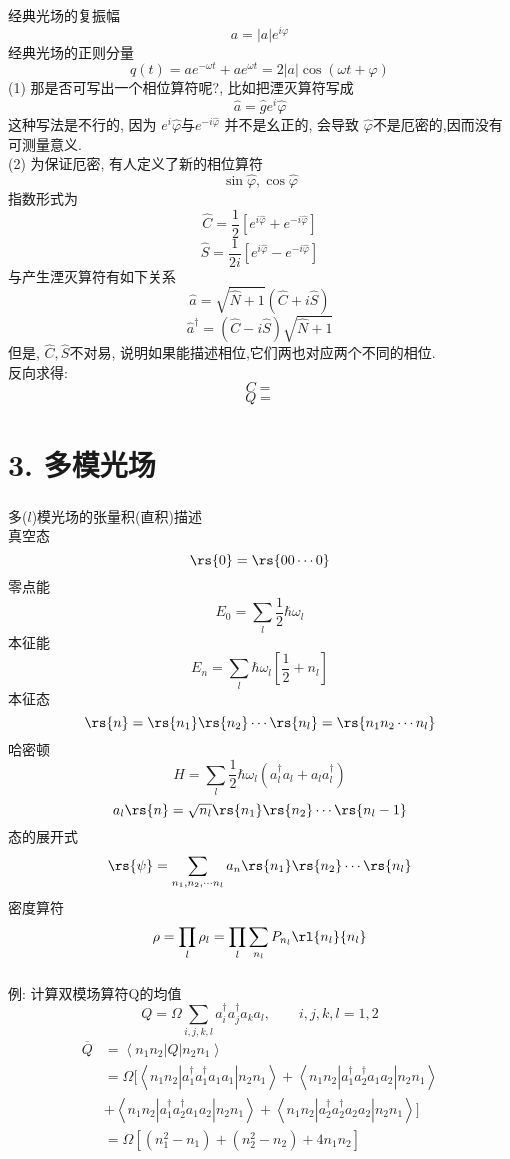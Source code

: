 \begin{frame} [allowframebreaks=] 
 \frametitle{}
      经典光场的复振幅 
      \[ a= \left|a\right| e^{i\varphi}\]
      经典光场的正则分量
      \[ q(t) = a e^{-\omega t} + a e^{\omega t} = 2\left|a \right|\cos(\omega t + \varphi)\]
      (1) 那是否可写出一个相位算符呢?, 比如把湮灭算符写成
      \[ \hat{a} = \hat{g} e ^ i \hat{\varphi} \]
      这种写法是不行的, 因为
      $e ^ i \hat{\varphi}$与$e ^ {-i \hat{\varphi}}$ 并不是幺正的, 会导致 $\hat{\varphi}$不是厄密的,因而没有可测量意义. \\ {\vspace*{0.3em}}
      (2) 为保证厄密, 有人定义了新的相位算符
      \[ \sin \hat{\varphi}, \cos \hat{\varphi}\]
      指数形式为
      \[\hat{C}= \frac{1}{2} [e^{i \hat{\varphi}} + e^{- i \hat{\varphi}}]\]
      \[\hat{S}= \frac{1}{2i} [e^{i \hat{\varphi}} - e^{- i \hat{\varphi}}]\]
      与产生湮灭算符有如下关系
      \[\hat{a}= \sqrt{\hat{N}+1}(\hat{C}+i\hat{S})\]
      \[\hat{a}^{\dagger}= (\hat{C}-i\hat{S})\sqrt{\hat{N}+1}\]
      但是, $\hat{C}, \hat{S}$不对易, 说明如果能描述相位,它们两也对应两个不同的相位.\\ 
      反向求得:
      \[ C= \]
      \[ Q= \]
\end{frame}

\section{3. 多模光场}

\begin{frame}[allowframebreaks=]  
 \frametitle{}
 多($l$)模光场的张量积(直积)描述\\ 
 真空态
 \[ \rs{0 }= \rs{00\cdots 0 } \] 
零点能
\[ E_0 = \sum_l \frac{1}{2} \hbar \omega_l\]
本征能
\[ E_n = \sum_l  \hbar \omega_l[\frac{1}{2}+ n_l]\]
本征态
\[\rs{n } =\rs{n_1 }\rs{n_2 }\cdots \rs{n_l }= \rs{n_1n_2  \cdots n_l } \]
哈密顿
\[ H = \sum_l \frac{1}{2} \hbar \omega_l(a^{\dagger}_l a_l + a_la^{\dagger}_l )\]
\[ a_l \rs{n } = \sqrt{n_l}\rs{n_1 }\rs{n_2 }\cdots \rs{n_{l}-1 } \]
态的展开式
\[ \rs{\psi} = \sum_{n_1, n_2, \cdots n_l} a_n \rs{n_1 }\rs{n_2 }\cdots \rs{n_{l}}\]
密度算符
\[ \rho = \prod_l \rho_l = \prod_l \sum_{n_l} P_{n_l}\rl{n_l}{n_l}
\]
\end{frame}

\begin{frame} 
 \frametitle{}
   例: 计算双模场算符Q的均值
   \[  Q= \Omega \sum_{i,j,k,l} a^{\dagger} _i a^{\dagger} _j a_k a_l, \qquad i,j,k,l =1,2 \]
   \[ \begin{aligned}
       \overline{Q}&= \left\langle n_1 n_2|Q|n_2n_1  \right\rangle \\
       &= \Omega[\left\langle n_1 n_2|a^{\dagger} _1 a^{\dagger} _1 a_1 a_1|n_2n_1  \right\rangle + \left\langle n_1 n_2|a^{\dagger} _1 a^{\dagger} _2 a_1 a_2|n_2n_1  \right\rangle \\ 
       & + \left\langle n_1 n_2|a^{\dagger} _1 a^{\dagger} _2 a_1 a_2|n_2n_1  \right\rangle  
       + \left\langle n_1 n_2|a^{\dagger} _2 a^{\dagger} _2 a_2 a_2|n_2n_1  \right\rangle]  \\
       &= \Omega [(n_1 ^2 -n_1) + (n_2 ^2 -n_2) +4n_1 n_2 ]
   \end{aligned}\]    
\end{frame}